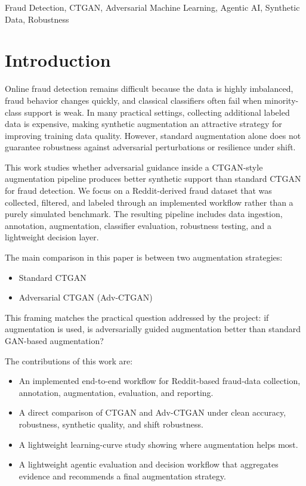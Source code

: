 \documentclass[conference]{IEEEtran}
\begin{document}
\begin{IEEEkeywords}
Fraud Detection, CTGAN, Adversarial Machine Learning, Agentic AI, Synthetic Data, Robustness
\end{IEEEkeywords}

\section{Introduction}

Online fraud detection remains difficult because the data is highly imbalanced, fraud behavior changes quickly, and classical classifiers often fail when minority-class support is weak. In many practical settings, collecting additional labeled data is expensive, making synthetic augmentation an attractive strategy for improving training data quality. However, standard augmentation alone does not guarantee robustness against adversarial perturbations or resilience under shift.

This work studies whether adversarial guidance inside a CTGAN-style augmentation pipeline produces better synthetic support than standard CTGAN for fraud detection. We focus on a Reddit-derived fraud dataset that was collected, filtered, and labeled through an implemented workflow rather than a purely simulated benchmark. The resulting pipeline includes data ingestion, annotation, augmentation, classifier evaluation, robustness testing, and a lightweight decision layer.

The main comparison in this paper is between two augmentation strategies:
\begin{itemize}
    \item Standard CTGAN
    \item Adversarial CTGAN (Adv-CTGAN)
\end{itemize}
This framing matches the practical question addressed by the project: if augmentation is used, is adversarially guided augmentation better than standard GAN-based augmentation?

The contributions of this work are:
\begin{itemize}
    \item An implemented end-to-end workflow for Reddit-based fraud-data collection, annotation, augmentation, evaluation, and reporting.
    \item A direct comparison of CTGAN and Adv-CTGAN under clean accuracy, robustness, synthetic quality, and shift robustness.
    \item A lightweight learning-curve study showing where augmentation helps most.
    \item A lightweight agentic evaluation and decision workflow that aggregates evidence and recommends a final augmentation strategy.
\end{itemize}
\end{document}
